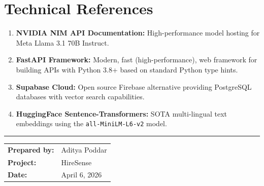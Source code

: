 \documentclass[12pt, a4paper]{article}
\newcommand{\code}[1]{\texttt{\small #1}}
\newcommand{\highlight}[1]{\textcolor{primary}{\textbf{#1}}}
\begin{document}
\section{Technical References}

\begin{enumerate}[label=[\arabic*], leftmargin=2cm]
    \item \highlight{NVIDIA NIM API Documentation:} High-performance model hosting for Meta Llama 3.1 70B Instruct.
    \item \highlight{FastAPI Framework:} Modern, fast (high-performance), web framework for building APIs with Python 3.8+ based on standard Python type hints.
    \item \highlight{Supabase Cloud:} Open source Firebase alternative providing PostgreSQL databases with vector search capabilities.
    \item \highlight{HuggingFace Sentence-Transformers:} SOTA multi-lingual text embeddings using the \code{all-MiniLM-L6-v2} model.
\end{enumerate}

\vspace{1cm}
\noindent\textcolor{primary}{\rule{\linewidth}{0.8pt}}
\vspace{6pt}

\noindent
\begin{tabular}{@{}ll}
    \textbf{Prepared by:} & Aditya Poddar \\
    \textbf{Project:}     & HireSense \\
    \textbf{Date:}        & April 6, 2026 \\
\end{tabular}
\end{document}
